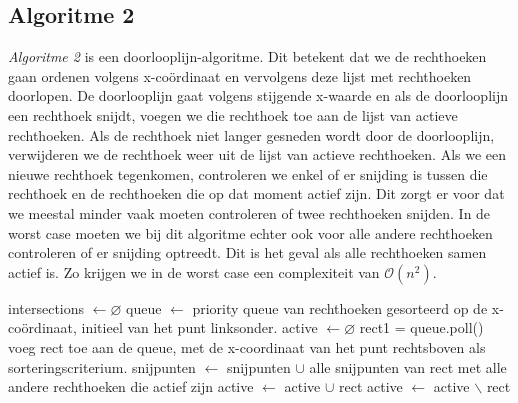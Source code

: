 \documentclass[11pt,a4paper,titlepage]{article}
\begin{document}
	\subsection{Algoritme 2}
	\emph{Algoritme 2} is een doorlooplijn-algoritme. Dit betekent dat we de rechthoeken gaan ordenen volgens x-coördinaat en vervolgens deze lijst met rechthoeken doorlopen. De doorlooplijn gaat volgens stijgende x-waarde en als de doorlooplijn een rechthoek snijdt, voegen we die rechthoek toe aan de lijst van actieve rechthoeken. Als de rechthoek niet langer gesneden wordt door de doorlooplijn, verwijderen we de rechthoek weer uit de lijst van actieve rechthoeken. Als we een nieuwe rechthoek tegenkomen, controleren we enkel of er snijding is tussen die rechthoek en de rechthoeken die op dat moment actief zijn. Dit zorgt er voor dat we meestal minder vaak moeten controleren of twee rechthoeken snijden. In de worst case moeten we bij dit algoritme echter ook voor alle andere rechthoeken controleren of er snijding optreedt. Dit is het geval als alle rechthoeken samen actief is. Zo krijgen we in de worst case een complexiteit van $\mathcal{O}(n^2)$.
	\begin{algorithm}[H]
		\caption{}
		\begin{algorithmic}[1]
			\State intersections $\gets \varnothing $
			\State queue $\gets$ priority queue van rechthoeken gesorteerd op de x-coördinaat, initieel van het punt linksonder.
			\State active $\gets \varnothing$
				\State rect1 = queue.poll()
					\State voeg rect toe aan de queue, met de x-coordinaat van het punt rechtsboven als sorteringscriterium.
					\State snijpunten $\gets$ snijpunten $\cup$ alle snijpunten van rect met alle andere rechthoeken die actief zijn
					\State active $\gets$ active $\cup$ rect
				\Else
					\State active $\gets$ active $\backslash$ rect
				\EndIf
			\EndWhile
		\end{algorithmic}
	\end{algorithm}
	
\end{document}
